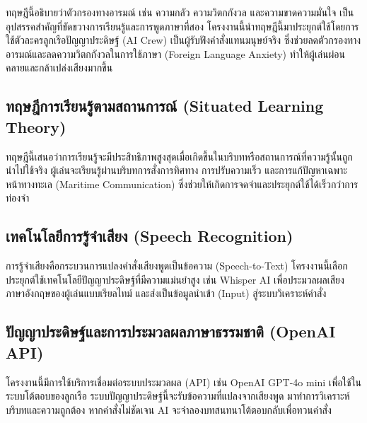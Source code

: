 ทฤษฎีนี้อธิบายว่าตัวกรองทางอารมณ์ เช่น ความกลัว ความวิตกกังวล และความขาดความมั่นใจ เป็นอุปสรรคสำคัญที่ขัดขวางการเรียนรู้และการพูดภาษาที่สอง\cite{sadigzade2025} โครงงานนี้นำทฤษฎีนี้มาประยุกต์ใช้โดยการใช้ตัวละครลูกเรือปัญญาประดิษฐ์ (AI Crew) เป็นผู้รับฟังคำสั่งแทนมนุษย์จริง ซึ่งช่วยลดตัวกรองทางอารมณ์และลดความวิตกกังวลในการใช้ภาษา (Foreign Language Anxiety) ทำให้ผู้เล่นผ่อนคลายและกล้าเปล่งเสียงมากขึ้น

\subsection{ทฤษฎีการเรียนรู้ตามสถานการณ์ (Situated Learning Theory)}

ทฤษฎีนี้เสนอว่าการเรียนรู้จะมีประสิทธิภาพสูงสุดเมื่อเกิดขึ้นในบริบทหรือสถานการณ์ที่ความรู้นั้นถูกนำไปใช้จริง ผู้เล่นจะเรียนรู้ผ่านบริบทการสั่งการทิศทาง การปรับความเร็ว และการแก้ปัญหาเฉพาะหน้าทางทะเล (Maritime Communication) ซึ่งช่วยให้เกิดการจดจำและประยุกต์ใช้ได้เร็วกว่าการท่องจำ

\subsection{เทคโนโลยีการรู้จำเสียง (Speech Recognition)}

การรู้จำเสียงคือกระบวนการแปลงคำสั่งเสียงพูดเป็นข้อความ (Speech-to-Text) โครงงานนี้เลือกประยุกต์ใช้เทคโนโลยีปัญญาประดิษฐ์ที่มีความแม่นยำสูง เช่น Whisper AI เพื่อประมวลผลเสียงภาษาอังกฤษของผู้เล่นแบบเรียลไทม์ และส่งเป็นข้อมูลนำเข้า (Input) สู่ระบบวิเคราะห์คำสั่ง

\subsection{ปัญญาประดิษฐ์และการประมวลผลภาษาธรรมชาติ (OpenAI API)}

โครงงานนี้มีการใช้บริการเชื่อมต่อระบบประมวลผล (API) เช่น OpenAI GPT-4o mini เพื่อใช้ในระบบโต้ตอบของลูกเรือ ระบบปัญญาประดิษฐ์นี้จะรับข้อความที่แปลงจากเสียงพูด มาทำการวิเคราะห์บริบทและความถูกต้อง หากคำสั่งไม่ชัดเจน AI จะจำลองบทสนทนาโต้ตอบกลับเพื่อทวนคำสั่ง
